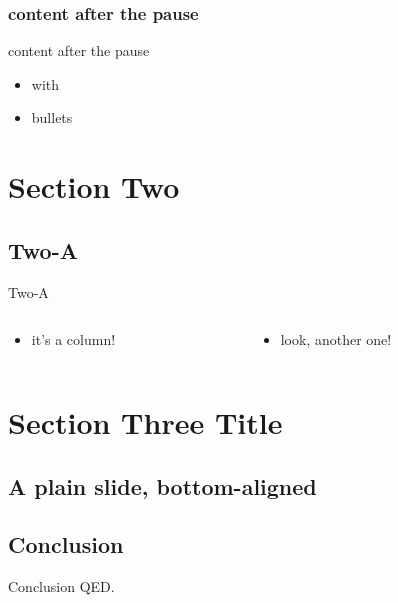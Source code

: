 \documentclass[
  ignorenonframetext,
  aspectratio=169,
]{beamer}
\providecommand{\tightlist}{%
  \setlength{\itemsep}{0pt}\setlength{\parskip}{0pt}}
\begin{document}
\hypertarget{content-after-the-pause}{%
\subsubsection{content after the pause}\label{content-after-the-pause}}

\begin{frame}{content after the pause}
\begin{itemize}[<+->]
\tightlist
\item
  with
\item
  bullets
\end{itemize}
\end{frame}

\hypertarget{section-two}{%
\section{Section Two}\label{section-two}}

\hypertarget{two-a}{%
\subsection{Two-A}\label{two-a}}

\begin{frame}{Two-A}
\begin{columns}[T]
\begin{column}{0.48\textwidth}
\begin{itemize}[<+->]
\tightlist
\item
  it's a column!
\end{itemize}
\end{column}

\begin{column}{0.48\textwidth}
\begin{itemize}[<+->]
\tightlist
\item
  look, another one!
\end{itemize}
\end{column}
\end{columns}
\end{frame}

\hypertarget{section-three-title}{%
\section{Section Three Title}\label{section-three-title}}

\hypertarget{a-plain-slide-bottom-aligned}{%
\subsection{A plain slide,
bottom-aligned}\label{a-plain-slide-bottom-aligned}}


\hypertarget{conclusion}{%
\subsection{Conclusion}\label{conclusion}}

\begin{frame}{Conclusion}
QED.
\end{frame}
\end{document}
